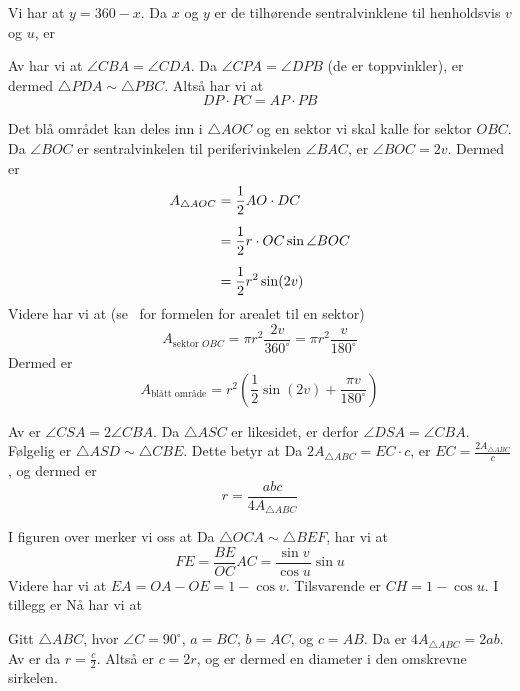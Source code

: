 \newpage
{}
Vi har at $ y=360-x $. Da $ x $ og $ y $ er de tilhørende sentralvinklene til henholdsvis $ v $ og $ u $, er

Av  har vi at $ \angle CBA=\angle CDA $. Da $ \angle CPA=\angle DPB $ (de er toppvinkler), er dermed $ \triangle PDA \sim \triangle PBC$. Altså har vi at
\[ DP\cdot PC=AP\cdot PB \]


Det blå området kan deles inn i $\triangle AOC$ og en sektor vi skal kalle for sektor $OBC$. Da $\angle BOC$ er sentralvinkelen til periferivinkelen $\angle BAC$, er $\angle BOC=2v$. Dermed er 
\begin{align*}
	A_{\triangle AOC}&=\frac{1}{2} AO\cdot DC\br
	&=\frac{1}{2}r\cdot OC\sin \angle BOC \br
	&= \frac{1}{2}r^2 \sin (2v)
\end{align*}
Videre har vi at (se \mb\ for formelen for arealet til en sektor)
\[ A_{\text{sektor $OBC$}} = \pi r^2 \frac{2v}{360^\circ}=\pi r^2\frac{v}{180^\circ} \]
Dermed er
\[ A_\text{blått område}=r^2\left(\frac{1}{2}\sin(2v)+\frac{\pi v}{180^\circ}\right) \]

\newpage
{}
Av  er $ \angle CSA=2\angle CBA $. Da $ \triangle ASC $ er likesidet, er derfor $ \angle DSA=\angle CBA $. Følgelig er $ \triangle ASD\sim \triangle CBE $. Dette betyr at
Da $ 2A_{\triangle ABC}=EC\cdot c $, er $ EC=\frac{2A_{\triangle ABC}}{c} $, og dermed er
\[ r=\frac{abc}{4A_{\triangle ABC}} \]

\newpage
{}
I figuren over merker vi oss at
Da $ \triangle OCA \sim \triangle BEF $, har vi at
\[ FE=\frac{BE}{OC}AC=\frac{\sin v}{\cos u}\sin u \]
Videre har vi at $ EA=OA-OE=1-\cos v $. Tilsvarende er $ CH=1-\cos u $. I tillegg er 
Nå har vi at

Gitt $ \triangle ABC$, hvor $ \angle C=90^\circ $, $ a=BC $, $ b=AC $, og $ c=AB $. Da er $ 4A_{\triangle ABC}=2ab $.
Av  er da $  r=\frac{c}{2} $. Altså er $ c=2r $, og er dermed en diameter i den omskrevne sirkelen.

